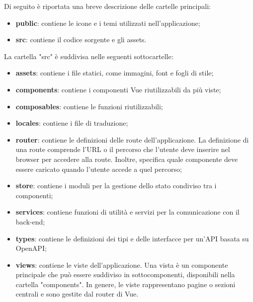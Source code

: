 \vspace{0.5\baselineskip}
\par Di seguito è riportata una breve descrizione delle cartelle principali:
\begin{itemize}
  \item \textbf{public}: contiene le icone e i temi utilizzati nell'applicazione;
  \item \textbf{src}: contiene il codice sorgente e gli assets.
\end{itemize}

\vspace{0.5\baselineskip}
\par La cartella "src" è suddivisa nelle seguenti sottocartelle:
\begin{itemize}
  \item \textbf{assets}: contiene i file statici, come immagini, font e fogli di stile;
  \item \textbf{components}: contiene i componenti Vue riutilizzabili da più viste;
  \item \textbf{composables}: contiene le funzioni riutilizzabili;
  \item \textbf{locales}: contiene i file  di traduzione;
  \item \textbf{router}: contiene le definizioni delle route dell'applicazione. La definizione di una route comprende l'URL o il percorso che l'utente deve inserire nel browser per accedere alla route. Inoltre, specifica quale componente deve essere caricato quando l'utente accede a quel percorso;
  \item \textbf{store}: contiene i moduli per la gestione dello stato condiviso tra i componenti;
  \item \textbf{services}: contiene funzioni di utilità e servizi per la comunicazione con il back-end;
  \item \textbf{types}: contiene le definizioni dei tipi e delle interfacce per un'API basata su OpenAPI;
  \item \textbf{views}: contiene le viste dell'applicazione. Una vista è un componente principale che può essere suddiviso in sottocomponenti, disponibili nella cartella "components". In genere, le viste rappresentano pagine o sezioni centrali e sono gestite dal router di Vue.
\end{itemize}